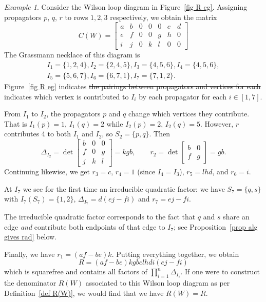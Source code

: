 \documentclass[11pt]{article}
\newcommand{\sanote}{\todo[color=violet!30]}
\theoremstyle{remark}
\newtheorem{eg}[thm]{Example}
\theoremstyle{definition}
\begin{document}
\begin{eg}
Consider the Wilson loop diagram in Figure~\ref{fig R eg}. Assigning propagators $p$, $q$, $r$ to rows $1,2,3$ respectively, we obtain the matrix
\[
C(W) = \begin{bmatrix} a & b & 0 & 0 & 0 & c & d \\ e & f & 0 & 0 & g & h & 0 \\ i & j & 0 & k & l & 0 & 0 \end{bmatrix}
\]
The Grassmann necklace of this diagram is 
\begin{gather*}I_1 = \{1,2,4\}, I_2 = \{2,4,5\}, I_3 = \{4,5,6\}, I_4=\{4,5,6\},\\ I_5=\{5,6,7\}, I_6 = \{6,7,1\}, I_7=\{7,1,2\}. \end{gather*}  
Figure~\ref{fig R eg} indicates \st{the pairings between propagators and vertices for each }{\color{violet} indicates which vertex is contributed to $I_i$ by each propagator for each} $i \in [1,7]$.  

From $I_1$ to $I_2$, the propagators $p$ and $q$ change which vertices they contribute. That is $I_1(p) = 1$, $I_1(q)= 2$ while $I_2(p) = 2$, $I_2(q)= 5$. However, $r$ contributes  4 to both $I_1$ and $I_2$, so $S_2 = \{p,q\}$.  Then
\[
\Delta_{I_2}=\det\begin{bmatrix} b & 0 & 0 \\ f & 0 & g \\ j & k & l \end{bmatrix} = kgb, \qquad r_2 = \det\begin{bmatrix} b & 0 \\ f & g \end{bmatrix} = gb.
\] 
Continuing likewise, we get $r_3 = c$, $r_4=1$ \sanote{see bit added to Alg 5.1 above}(since $I_4 = I_3$), $r_5 = lhd$, and $r_6 = i$.

At $I_7$ we see for the first time an irreducible quadratic factor: we have $S_7 = \{q,s\}$ with $I_7(S_7) = \{ 1,2\}$, $\Delta_{I_7} = d(ej-fi)$ and $r_7 = ej-fi$. 

The irreducible quadratic factor corresponds to the fact that $q$ and $s$ share an edge {\em and} contribute both endpoints of that edge to $I_7$; see Proposition~\ref{prop alg gives rad} below.  

Finally, we have $r_1 = (af-be)k$.  Putting everything together, we obtain
\[
R = (af-be)kgbclhdi(ej-fi)
\]
which is squarefree and contains all factors of $\prod_{i=1}^{n}\Delta_{I_i}$. If one were to construct the denominator $R(W)$ associated to this Wilson loop diagram as per Definition~\ref{def R(W)}, we would find that we have $R(W) = R$.
\end{eg}
\end{document}
